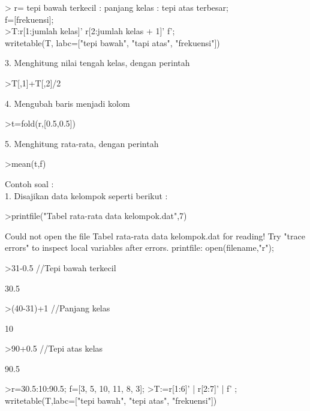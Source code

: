 \documentclass[a4paper,10pt]{article}
\begin{document}
\begin{eulernotebook}
\begin{eulercomment}
\begin{eulercomment}
\begin{eulercomment}
\begin{eulercomment}
\begin{eulercomment}
\begin{eulercomment}
\begin{eulercomment}
\begin{eulercomment}
\begin{eulercomment}
\begin{eulercomment}
\begin{eulercomment}
\textgreater{} r= tepi bawah terkecil : panjang kelas : tepi atas terbesar;\\
f=[frekuensi];\\
\textgreater{}T:r[1:jumlah kelas]' \textbar{} r[2:jumlah kelas + 1]' \textbar{}f';\\
writetable(T, labc=["tepi bawah", "tapi atas", "frekuensi"])

3. Menghitung nilai tengah kelas, dengan perintah

\textgreater{}T[,1]+T[,2]/2

4. Mengubah baris menjadi kolom

\textgreater{}t=fold(r,[0.5,0.5])

5. Menghitung rata-rata, dengan perintah

\textgreater{}mean(t,f)

Contoh soal :\\
1. Disajikan data kelompok seperti berikut :
\end{eulercomment}
\begin{eulerprompt}
>printfile("Tabel rata-rata data kelompok.dat",7)
\end{eulerprompt}
\begin{euleroutput}
  Could not open the file
  Tabel rata-rata data kelompok.dat
  for reading!
  Try "trace errors" to inspect local variables after errors.
  printfile:
      open(filename,"r");
\end{euleroutput}
\begin{eulerprompt}
>31-0.5  //Tepi bawah terkecil
\end{eulerprompt}
\begin{euleroutput}
  30.5
\end{euleroutput}
\begin{eulerprompt}
>(40-31)+1  //Panjang kelas
\end{eulerprompt}
\begin{euleroutput}
  10
\end{euleroutput}
\begin{eulerprompt}
>90+0.5 //Tepi atas kelas
\end{eulerprompt}
\begin{euleroutput}
  90.5
\end{euleroutput}
\begin{eulerprompt}
>r=30.5:10:90.5; f=[3, 5, 10, 11, 8, 3];
>T:=r[1:6]' | r[2:7]' | f' ; writetable(T,labc=["tepi bawah", "tepi atas", "frekuensi"])
\end{eulerprompt}
\begin{euleroutput}

\end{euleroutput}
\end{eulercomment}
\end{eulercomment}
\end{eulercomment}
\end{eulercomment}
\end{eulercomment}
\end{eulercomment}
\end{eulercomment}
\end{eulercomment}
\end{eulercomment}
\end{eulercomment}
\end{eulernotebook}
\end{document}
